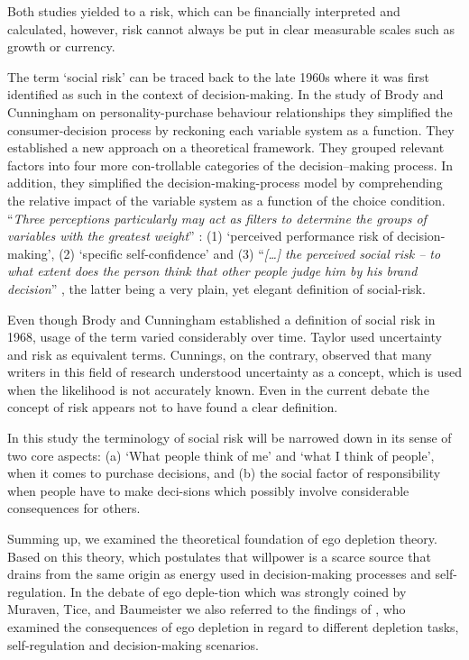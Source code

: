 Both studies yielded to a risk, which can be financially interpreted and calculated, however, risk cannot always be put in clear measurable scales such as growth or currency.\par
The term ‘social risk’ can be traced back to the late 1960s where it was first identified as such in the context of decision-making. In the study of Brody and Cunningham \citep{brody1968personality} on personality-purchase behaviour relationships they simplified the consumer-decision process by reckoning each variable system as a function. They established a new approach on a theoretical framework. They grouped relevant factors into four more con-trollable categories of the decision–making process.  In addition, they simplified the decision-making-process model by comprehending the relative impact of the variable system as a function of the choice condition. “\emph{Three perceptions particularly may act as filters to determine the groups of variables with the greatest weight}” \citep{brody1968personality}: (1) ‘perceived performance risk of decision-making’, (2) ‘specific self-confidence’ and (3) “\emph{[\ldots] the perceived social risk – to what extent does the person think that other people judge him by his brand decision}” \citep[p.~51]{brody1968personality}, the latter being a very plain, yet elegant definition of social-risk.\par
Even though Brody and Cunningham established a definition of social risk in 1968, usage of the term varied considerably over time. Taylor \citep{taylor1974role} used uncertainty and risk as equivalent terms. Cunnings, on the contrary, observed that many writers in this field of research understood uncertainty as a concept, which is used when the likelihood is not accurately known. Even in the current debate the concept of risk appears not to have found a clear definition.\par
In this study the terminology of social risk will be narrowed down in its sense of two core aspects: (a) ‘What people think of me’ and ‘what I think of people’, when it comes to purchase decisions, and (b) the social factor of responsibility when people have to make deci-sions which possibly involve considerable consequences for others.\par
Summing up, we examined the theoretical foundation of ego depletion theory. Based on this theory, which postulates that willpower is a scarce source that drains from the same origin as energy used in decision-making processes and self-regulation. In the debate of ego deple-tion which was strongly coined by Muraven, Tice, and Baumeister we also referred to the findings of \citep{vohs2000self,pocheptsova2009deciding,bruyneel2009felt}, who examined the consequences of ego depletion in regard to different depletion tasks, self-regulation and decision-making scenarios.\par
